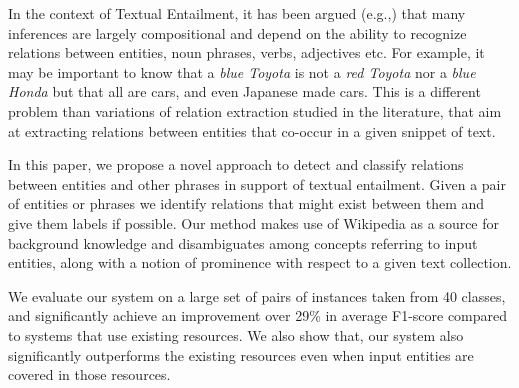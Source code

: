 {\small
In the context of Textual Entailment,
it has been argued
(e.g.,\cite{maccartney-manning:2008:PAPERS}) that many
inferences are largely compositional and depend on the ability
to recognize relations between entities, noun phrases, verbs,
adjectives etc. For example, it may be important to know that a
{\em blue Toyota} is not a {\em red Toyota} nor a {\em blue
Honda} but that all are cars, and even Japanese made cars. This
is a different problem than variations of relation extraction
studied in the literature, that aim at extracting relations
between entities that co-occur in a given snippet of text.

In this paper, we propose a novel approach to detect and
classify relations between entities and other phrases in
support of textual entailment. Given a pair of entities or
phrases we identify relations that might exist between
them and give them labels if possible.
Our method makes use of Wikipedia as a source for background knowledge and
disambiguates among concepts referring to input entities,
along with a notion of prominence with
respect to a given text collection.

We evaluate our system on a large set of pairs of instances
taken from 40 classes, and significantly achieve an improvement over 29\%  in average F1-score
compared to systems that use existing resources. We also show that, our system also significantly outperforms the
existing resources even when input entities are covered in those resources.

}